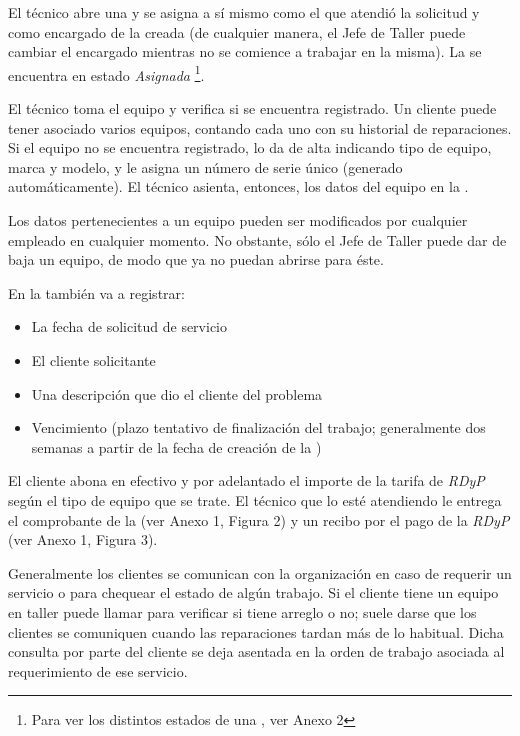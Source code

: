 \documentclass[12pt]{extarticle}
\begin{document}
\begin{spacing}{1.2}
   El técnico abre una \OT{} y se asigna a sí mismo como el que atendió la solicitud y como encargado de la \OT{} creada (de cualquier manera, el Jefe de Taller puede cambiar el encargado mientras no se comience a trabajar en la misma). La \OT{} se encuentra en estado \textit{Asignada} \footnote{Para ver los distintos estados de una \OT{}, ver Anexo 2}. 

    El técnico toma el equipo y verifica si se encuentra registrado. Un cliente puede tener asociado varios equipos, contando cada uno con su historial de reparaciones. Si el equipo no se encuentra registrado, lo da de alta indicando tipo de equipo, marca y modelo, y le asigna un número de serie único (generado automáticamente). El técnico asienta, entonces, los datos del equipo en la \OT{}.

    Los datos pertenecientes a un equipo pueden ser modificados por cualquier empleado en cualquier momento. No obstante, sólo el Jefe de Taller puede dar de baja un equipo, de modo que ya no puedan abrirse \OTs{} para éste.
   
    En la \OT{} también va a registrar:
    \begin{itemize}
        \item La fecha de solicitud de servicio
        \item El cliente solicitante
        \item Una descripción que dio el cliente del problema
        \item Vencimiento (plazo tentativo de finalización del trabajo; generalmente dos semanas a partir de la fecha de creación de la \OT{})
    \end{itemize}

    El cliente abona en efectivo y por adelantado el importe de la tarifa de \textit{RDyP} según el tipo de equipo que se trate. El técnico que lo esté atendiendo le entrega el comprobante de la \OT{} (ver Anexo 1, Figura 2) y un recibo por el pago de la \textit{RDyP} (ver Anexo 1, Figura 3). 

    Generalmente los clientes se comunican con la organización en caso de requerir un servicio o para chequear el estado de algún trabajo. Si el cliente tiene un equipo en taller puede llamar para verificar si tiene arreglo o no; suele darse que los clientes se comuniquen cuando las reparaciones tardan más de lo habitual. Dicha consulta por parte del cliente se deja asentada en la orden de trabajo asociada al requerimiento de ese servicio.\\


\end{spacing}
\end{document}
